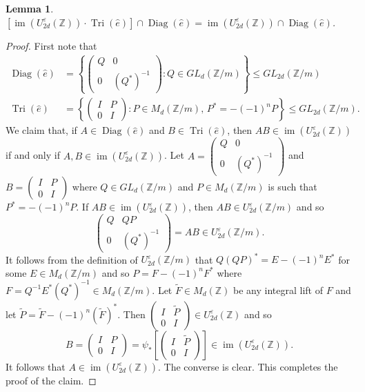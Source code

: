 \documentclass[11pt,a4paper,leqno]{amsart}
\newtheorem{lemma}[theorem]{Lemma}
\theoremstyle{definition}
\theoremstyle{remark}
\newcommand{\wh}{\widehat}
\newcommand{\wt}{\widetilde}
\newcommand{\Z}{\mathbb{Z}}
\DeclareMathOperator{\IM}{im}
\DeclareMathOperator{\DiagIsom}{Diag}
\DeclareMathOperator{\TriIsom}{Tri}
\newcommand{\U}{U^{\varepsilon}}
\begin{document}
\begin{lemma}\label{lem:tri}
$[\IM(\U_{2d}(\Z)) \cdot \TriIsom(\wh e)] \cap \DiagIsom(\wh e) = \IM(\U_{2d}(\Z)) \cap \DiagIsom(\wh e)$. 
\end{lemma}

\begin{proof}
First note that
\begin{align*}
\DiagIsom(\wh e) &= \left\{ \left(\begin{smallmatrix} Q & 0 \\ 0 & (Q^*)^{-1} \end{smallmatrix}\right) : Q \in GL_d(\Z/m) \right\} \le GL_{2d}(\Z/m) \\
\TriIsom(\wh e) &= \left\{ \left(\begin{smallmatrix} I & P \\ 0 & I \end{smallmatrix}\right) : P \in M_d(\Z/m), \, P^* = -(-1)^nP \right\} \le GL_{2d}(\Z/m).
\end{align*} 
We claim that, if $A \in \DiagIsom(\wh e)$ and $B \in \TriIsom(\wh e)$, then $AB \in \IM{(\U_{2d}(\Z))}$ if and only if $A, B \in \IM{(\U_{2d}(\Z))}$.
Let $A = \left(\begin{smallmatrix} Q & 0 \\ 0 & (Q^*)^{-1} \end{smallmatrix}\right)$ and $B = \left(\begin{smallmatrix} I & P \\ 0 & I \end{smallmatrix}\right)$ where $Q \in GL_d(\Z/m)$ and $P \in M_d(\Z/m)$ is such that $P^* = - (-1)^nP$. If $AB \in \IM{(\U_{2d}(\Z))}$, then $AB \in \U_{2d}(\Z/m)$ and so
\[ \left(\begin{smallmatrix} Q & QP \\ 0 & (Q^*)^{-1} \end{smallmatrix}\right) = AB \in \U_{2d}(\Z/m). \]
It follows from the definition of $\U_{2d}(\Z/m)$ that $Q(QP)^* = E - (-1)^n E^*$ for some $E \in M_d(\Z/m)$ and so $P = F - (-1)^n F^*$ where $F = Q^{-1}E^* (Q^*)^{-1} \in M_d(\Z/m)$. 
Let $\wt F \in M_d(\Z)$ be any integral lift of $F$ and let $\wt P = \wt F - (-1)^n (\wt F)^*$. Then $\left(\begin{smallmatrix} I & \wt P \\ 0 & I \end{smallmatrix}\right) \in \U_{2d}(\Z)$ and so 
\[ B = \left(\begin{smallmatrix} I & P \\ 0 & I \end{smallmatrix}\right) = \psi_*\left[\left(\begin{smallmatrix} I & \wt P \\ 0 & I \end{smallmatrix}\right)\right] \in \IM{(\U_{2d}(\Z))}. \]
It follows that $A \in \IM{(\U_{2d}(\Z))}$. The converse is clear. This completes the proof of the claim.


\end{proof}
\end{document}
